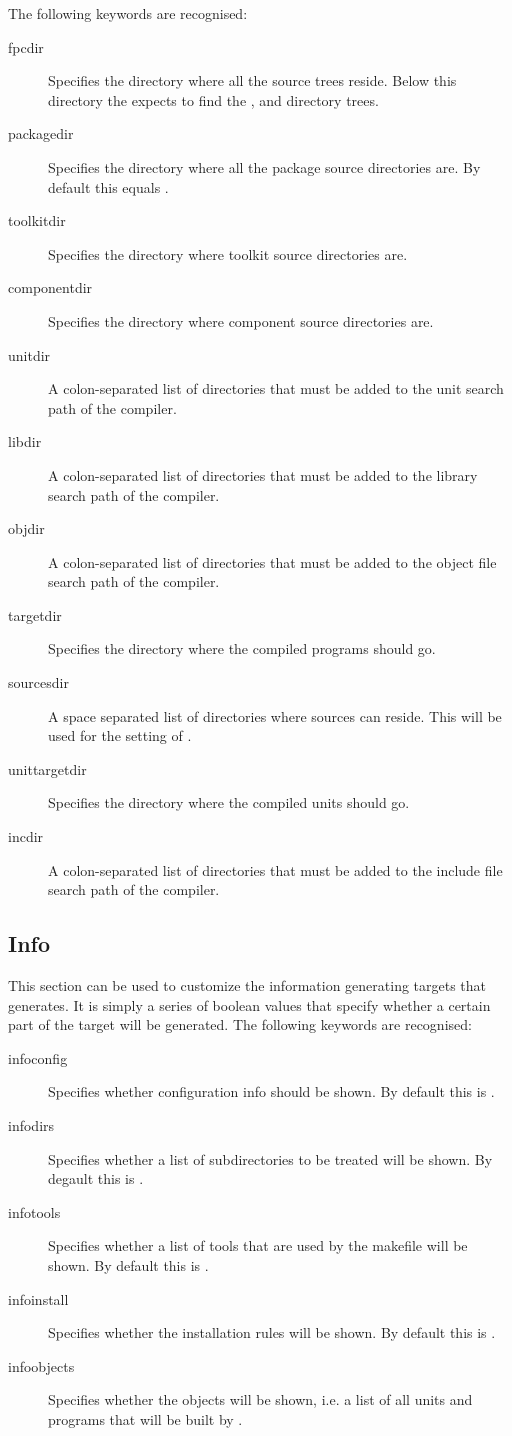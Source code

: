 The following keywords are recognised:
\begin{description}
\item[fpcdir]
Specifies the directory where all the \fpc source trees reside. Below this
directory the  expects to find the ,  and
 directory trees.
\item[packagedir]
Specifies the directory where all the package source directories are. By
default this equals .
\item[toolkitdir]
Specifies the directory where toolkit source directories are.
\item[componentdir]
Specifies the directory where component source directories are.
\item[unitdir]
A colon-separated list of directories that must be added to the unit
search path of the compiler.
\item[libdir]
A colon-separated list of directories that must be added to the library
search path of the compiler.
\item[objdir]
A colon-separated list of directories that must be added to the object file
search path of the compiler.
\item[targetdir]
Specifies the directory where the compiled programs should go.
\item[sourcesdir]
A space separated list of directories where sources can reside.
This will be used for the  setting of \gnu {}.
\item[unittargetdir]
Specifies the directory where the compiled units should go.
\item[incdir]
A colon-separated list of directories that must be added to the include file
search path of the compiler.
\end{description}

\subsection{Info}
This section can be used to customize the information generating
targets that  generates. It is simply a series of boolean
values that specify whether a certain part of the  target will be
generated. The following keywords are recognised:
\begin{description}
\item[infoconfig]
Specifies whether configuration info should be shown. By default this is
.
\item[infodirs]
Specifies whether a list of subdirectories to be treated will be shown. By
degault this is .
\item[infotools]
Specifies whether a list of tools that are used by the makefile will be
shown. By default this is .
\item[infoinstall]
Specifies whether the installation rules will be shown. By default this is
.
\item[infoobjects]
Specifies whether the  objects will be shown, i.e. a list of
all units and programs that will be built by .
\end{description}


